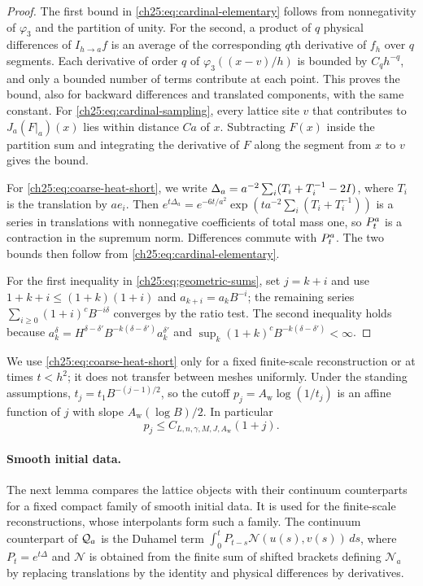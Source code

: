\begin{proof}
The first bound in \eqref{ch25:eq:cardinal-elementary} follows from nonnegativity of $\varphi_3$ and the partition of unity. For the second, a product of $q$ physical differences of $I_{h\to a}f$ is an average of the corresponding $q$th derivative of $f_h$ over $q$ segments. Each derivative of order $q$ of $\varphi_3((x-v)/h)$ is bounded by $C_qh^{-q}$, and only a bounded number of terms contribute at each point. This proves the bound, also for backward differences and translated components, with the same constant. For \eqref{ch25:eq:cardinal-sampling}, every lattice site $v$ that contributes to $J_a(F|_a)(x)$ lies within distance $Ca$ of $x$. Subtracting $F(x)$ inside the partition sum and integrating the derivative of $F$ along the segment from $x$ to $v$ gives the bound.

For \eqref{ch25:eq:coarse-heat-short}, we write $\Delta_a=a^{-2}\sum_i(T_i+T_i^{-1}-2I)$, where $T_i$ is the translation by $ae_i$. Then $e^{t\Delta_a}=e^{-6t/a^2}\exp(ta^{-2}\sum_i(T_i+T_i^{-1}))$ is a series in translations with nonnegative coefficients of total mass one, so $P_{t}^{a}$ is a contraction in the supremum norm. Differences commute with $P_{t}^{a}$. The two bounds then follow from \eqref{ch25:eq:cardinal-elementary}.

For the first inequality in \eqref{ch25:eq:geometric-sums}, set $j=k+i$ and use $1+k+i\le(1+k)(1+i)$ and $a_{k+i}=a_kB^{-i}$; the remaining series $\sum_{i\ge0}(1+i)^cB^{-i\delta}$ converges by the ratio test. The second inequality holds because $a_k^\delta=H^{\delta-\delta'}B^{-k(\delta-\delta')}a_k^{\delta'}$ and $\sup_k(1+k)^cB^{-k(\delta-\delta')}<\infty$.
\end{proof}

We use \eqref{ch25:eq:coarse-heat-short} only for a fixed finite-scale reconstruction or at times $t<h^2$; it does not transfer between meshes uniformly. Under the standing assumptions, $t_j=t_1B^{-(j-1)/2}$, so the cutoff $p_j=A_{\mathrm w}\log(1/t_j)$ is an affine function of $j$ with slope $A_{\mathrm w}(\log B)/2$. In particular
\begin{equation}\label{ch25:eq:cutoff-linear}
 p_j\le C_{L,n,\gamma,M,J,A_{\mathrm w}}(1+j).
\end{equation}

\paragraph{Smooth initial data.}
The next lemma compares the lattice objects with their continuum counterparts for a fixed compact family of smooth initial data. It is used for the finite-scale reconstructions, whose interpolants form such a family. The continuum counterpart of $\mathcal Q_{a}$ is the Duhamel term $\int_0^tP_{t-s}\mathcal N(u(s),v(s))\,ds$, where $P_t=e^{t\Delta}$ and $\mathcal N$ is obtained from the finite sum of shifted brackets defining $\mathcal N_a$ by replacing translations by the identity and physical differences by derivatives.

